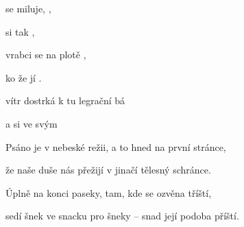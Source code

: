 

\zr
{} se miluje,  ,

 si  tak ,

vrabci se na plotě ,

ko že  jí .
\kr

\zs
{} vítr dostrká k  tu  legrační bá 

a  si ve svým    
\ks

\zr  \kr

\zs
Psáno je v nebeské režii, a to hned na první stránce,

že naše duše nás přežijí v jinačí tělesný schránce.
\ks

\zr  \kr

\zs
Úplně na konci paseky, tam, kde se ozvěna tříští,

sedí šnek ve snacku pro šneky -- snad její podoba příští.     \ks

\zr  \kr

\kp





